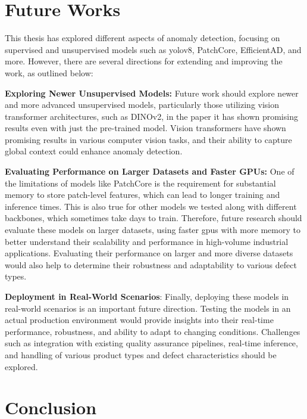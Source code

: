 \chapter{Future Works}

This thesis has explored different aspects of anomaly detection, focusing on supervised and unsupervised models such as \gls{yolo}v8, PatchCore, EfficientAD, and more. However, there are several directions for extending and improving the work, as outlined below:

\textbf{Exploring Newer Unsupervised Models:} Future work should explore newer and more advanced unsupervised models, particularly those utilizing vision transformer architectures, such as DINOv2\cite{oquab2023dinov2}, in the paper it has shown promising results even with just the pre-trained model. Vision transformers have shown promising results in various computer vision tasks, and their ability to capture global context could enhance anomaly detection.

\textbf{Evaluating Performance on Larger Datasets and Faster GPUs:} One of the limitations of models like PatchCore is the requirement for substantial memory to store patch-level features, which can lead to longer training and inference times. This is also true for other models we tested along with different backbones, which sometimes take days to train. Therefore, future research should evaluate these models on larger datasets, using faster \glspl{gpu} with more memory to better understand their scalability and performance in high-volume industrial applications. Evaluating their performance on larger and more diverse datasets would also help to determine their robustness and adaptability to various defect types.

\textbf{Deployment in Real-World Scenarios}: Finally, deploying these models in real-world scenarios is an important future direction. Testing the models in an actual production environment would provide insights into their real-time performance, robustness, and ability to adapt to changing conditions. Challenges such as integration with existing quality assurance pipelines, real-time inference, and handling of various product types and defect characteristics should be explored.

\chapter{Conclusion}

